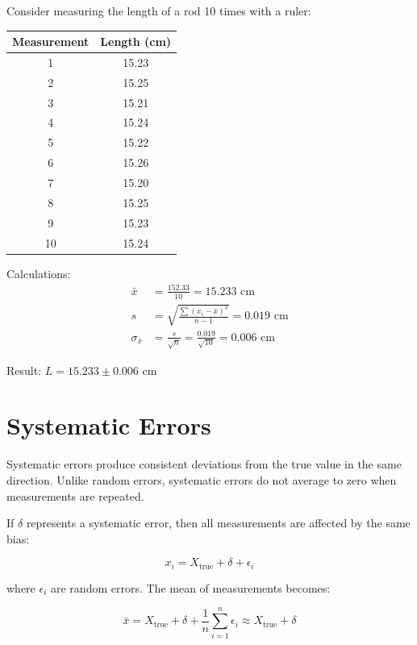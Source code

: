 \documentclass[twoside]{book}
\begin{document}
Consider measuring the length of a rod 10 times with a ruler:

\begin{center}
\begin{tabular}{cc}
\toprule
Measurement & Length (cm) \\
\midrule
1 & 15.23 \\
2 & 15.25 \\
3 & 15.21 \\
4 & 15.24 \\
5 & 15.22 \\
6 & 15.26 \\
7 & 15.20 \\
8 & 15.25 \\
9 & 15.23 \\
10 & 15.24 \\
\bottomrule
\end{tabular}
\end{center}

Calculations:
\begin{align}
\bar{x} &= \frac{152.33}{10} = 15.233 \text{ cm} \\
s &= \sqrt{\frac{\sum(x_i - \bar{x})^2}{n-1}} = 0.019 \text{ cm} \\
\sigma_{\bar{x}} &= \frac{s}{\sqrt{n}} = \frac{0.019}{\sqrt{10}} = 0.006 \text{ cm}
\end{align}

Result: $L = 15.233 \pm 0.006$ cm

\section{Systematic Errors}

Systematic errors produce consistent deviations from the true value in the same direction. Unlike random errors, systematic errors do not average to zero when measurements are repeated.

If $\delta$ represents a systematic error, then all measurements are affected by the same bias:

\begin{equation*}
x_i = X_{\text{true}} + \delta + \epsilon_i
\end{equation*}

where $\epsilon_i$ are random errors. The mean of measurements becomes:

\begin{equation*}
\bar{x} = X_{\text{true}} + \delta + \frac{1}{n}\sum_{i=1}^{n}\epsilon_i \approx X_{\text{true}} + \delta
\end{equation*}
\end{document}
